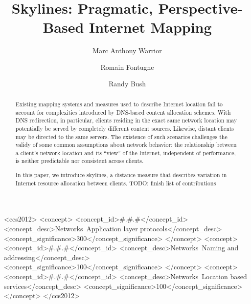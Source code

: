 \documentclass[10pt, sigconf]{acmart}
\begin{document}
\title[Skylines]{Skylines: Pragmatic, Perspective-Based Internet Mapping}

\author{Marc Anthony Warrior}

\author{Romain Fontugne}
\author{Randy Bush}

\renewcommand{\shortauthors}{M. Warrior et al.}

\begin{abstract}

    Existing mapping systems and measures used to describe Internet location
    fail to account for complexities introduced by DNS-based content
    allocation schemes. With DNS redirection, in particular, clients residing in
    the exact same network location may potentially be served by completely
    different content sources. Likewise, distant clients may be directed to the
    same servers. The existence of such scenarios challenges the validy of
    some common assumptions about network behavior: the relationship between a
    client's network location and its ``view'' of the Internet, independent of
    performance, is neither predictable nor consistent across clients. 

    In this paper, we introduce skylines, a distance measure that describes
    variation in Internet resource allocation between clients. TODO: finish list
    of contributions

\end{abstract}

%
%


\begin{CCSXML}
<ccs2012>
    <concept>
        <concept_id>#.#.#</concept_id>
        <concept_desc>Networks~Application layer protocols</concept_desc>
        <concept_significance>300</concept_significance>
    </concept>
    <concept>
        <concept_id>#.#.#</concept_id>
        <concept_desc>Networks~Naming and addressing</concept_desc>
        <concept_significance>100</concept_significance>
    </concept>
    <concept>
        <concept_id>#.#.#</concept_id>
        <concept_desc>Networks~Location based services</concept_desc>
        <concept_significance>100</concept_significance>
    </concept>
</ccs2012>
\end{CCSXML}
\end{document}
